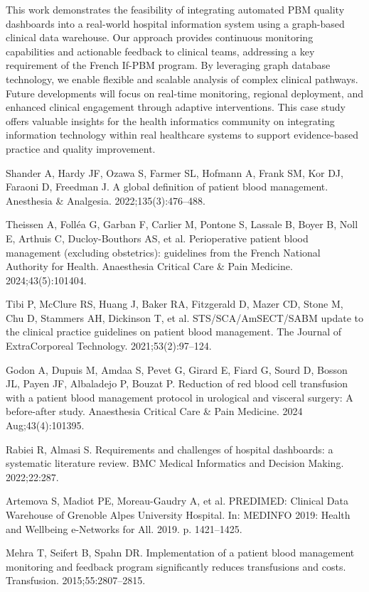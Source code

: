 \documentclass{IOS-Book-Article}
\begin{document}
This work demonstrates the feasibility of integrating automated PBM quality dashboards into a real-world hospital information system using a graph-based clinical data warehouse. Our approach provides continuous monitoring capabilities and actionable feedback to clinical teams, addressing a key requirement of the French If-PBM program. By leveraging graph database technology, we enable flexible and scalable analysis of complex clinical pathways. Future developments will focus on real-time monitoring, regional deployment, and enhanced clinical engagement through adaptive interventions. This case study offers valuable insights for the health informatics community on integrating information technology within real healthcare systems to support evidence-based practice and quality improvement.

\begin{thebibliography}{99}

Shander A, Hardy JF, Ozawa S, Farmer SL, Hofmann A, Frank SM, Kor DJ, Faraoni D, Freedman J. A global definition of patient blood management. Anesthesia \& Analgesia. 2022;135(3):476--488.

Theissen A, Folléa G, Garban F, Carlier M, Pontone S, Lassale B, Boyer B, Noll E, Arthuis C, Ducloy-Bouthors AS, et al. Perioperative patient blood management (excluding obstetrics): guidelines from the French National Authority for Health. Anaesthesia Critical Care \& Pain Medicine. 2024;43(5):101404.

Tibi P, McClure RS, Huang J, Baker RA, Fitzgerald D, Mazer CD, Stone M, Chu D, Stammers AH, Dickinson T, et al. STS/SCA/AmSECT/SABM update to the clinical practice guidelines on patient blood management. The Journal of ExtraCorporeal Technology. 2021;53(2):97--124.

Godon A, Dupuis M, Amdaa S, Pevet G, Girard E, Fiard G, Sourd D, Bosson JL, Payen JF, Albaladejo P, Bouzat P. Reduction of red blood cell transfusion with a patient blood management protocol in urological and visceral surgery: A before-after study. Anaesthesia Critical Care \& Pain Medicine. 2024 Aug;43(4):101395.

Rabiei R, Almasi S. Requirements and challenges of hospital dashboards: a systematic literature review. BMC Medical Informatics and Decision Making. 2022;22:287.

Artemova S, Madiot PE, Moreau-Gaudry A, et al. PREDIMED: Clinical Data Warehouse of Grenoble Alpes University Hospital. In: MEDINFO 2019: Health and Wellbeing e-Networks for All. 2019. p. 1421--1425.

Mehra T, Seifert B, Spahn DR. Implementation of a patient blood management monitoring and feedback program significantly reduces transfusions and costs. Transfusion. 2015;55:2807--2815.

\end{thebibliography}
\end{document}
